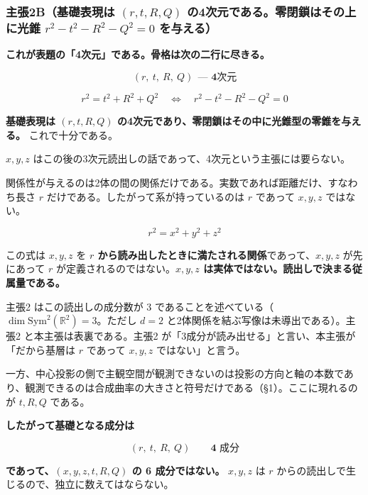 \documentclass[
  10pt,
]{ltjsarticle}
\begin{document}
\subsubsection{\texorpdfstring{主張2B（基礎表現は \((r,t,R,Q)\)
の4次元である。零閉鎖はその上に光錐 \(r^2-t^2-R^2-Q^2=0\)
を与える）}{主張2B（基礎表現は (r,t,R,Q) の4次元である。零閉鎖はその上に光錐 r\^{}2-t\^{}2-R\^{}2-Q\^{}2=0 を与える）}}\label{ux4e3bux5f352bux57faux790eux8868ux73feux306f-rtrq-ux306e4ux6b21ux5143ux3067ux3042ux308bux96f6ux9589ux9396ux306fux305dux306eux4e0aux306bux5149ux9310-r2-t2-r2-q20-ux3092ux4e0eux3048ux308b}

\textbf{これが表題の「4次元」である。骨格は次の二行に尽きる。}

\[\boxed{\;(r,\ t,\ R,\ Q)\ \ \textbf{— 4次元}\;}\]

\[\boxed{\;r^2 = t^2 + R^2 + Q^2 \quad\Longleftrightarrow\quad r^2 - t^2 - R^2 - Q^2 = 0\;}\]

\textbf{基礎表現は \((r,t,R,Q)\)
の4次元であり、零閉鎖はその中に光錐型の零錐を与える。}
これで十分である。

\(x, y, z\)
はこの後の3次元読出しの話であって、4次元という主張には要らない。

関係性が与えるのは2体の間の関係だけである。実数であれば距離だけ、すなわち長さ
\(r\) だけである。したがって系が持っているのは \(r\) であって
\(x, y, z\) ではない。

\[r^2 = x^2 + y^2 + z^2\]

この式は \(x, y, z\) を \textbf{\(r\)
から読み出したときに満たされる関係}であって、\(x, y, z\) が先にあって
\(r\) が定義されるのではない。\textbf{\(x, y, z\)
は実体ではない。読出しで決まる従属量である。}

主張2 はこの読出しの成分数が 3
であることを述べている（\(\dim\mathrm{Sym}^2(\mathbb{R}^2) = 3\)。ただし
\(d=2\) と2体関係を結ぶ写像は未導出である）。主張2
と本主張は表裏である。主張2
が「3成分が読み出せる」と言い、本主張が「だから基層は \(r\) であって
\(x,y,z\) ではない」と言う。

一方、中心投影の側で主観空間が観測できないのは投影の方向と軸の本数であり、観測できるのは合成曲率の大きさと符号だけである（§1）。ここに現れるのが
\(t, R, Q\) である。

\textbf{したがって基礎となる成分は}

\[(r,\ t,\ R,\ Q) \qquad \textbf{4 成分}\]

\textbf{であって、\((x, y, z, t, R, Q)\) の 6 成分ではない。}
\(x, y, z\) は \(r\) からの読出しで生じるので、独立に数えてはならない。
\end{document}
